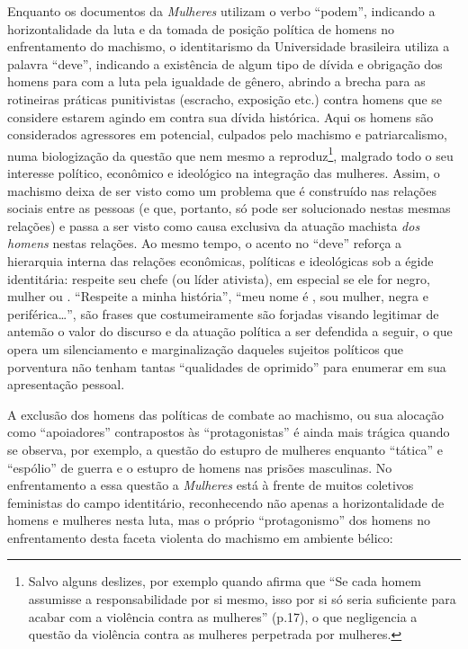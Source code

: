 Enquanto os documentos da \emph{ Mulheres} utilizam o verbo
``podem'', indicando a horizontalidade da luta e da tomada de posição
política de homens no enfrentamento do machismo, o identitarismo da
Universidade brasileira utiliza a palavra ``deve'', indicando a
existência de algum tipo de dívida e obrigação dos homens para com a
luta pela igualdade de gênero, abrindo a brecha para as rotineiras
práticas punitivistas (escracho, exposição etc.) contra homens que se
considere estarem agindo em contra sua dívida histórica. Aqui os homens
são considerados agressores em potencial, culpados pelo machismo e
patriarcalismo, numa biologização da questão que nem mesmo a 
reproduz\footnote{Salvo alguns deslizes, por exemplo quando afirma que
  ``Se cada homem assumisse a responsabilidade por si mesmo, isso por si
  só seria suficiente para acabar com a violência contra as mulheres''
  (p.17), o que negligencia a questão da violência contra as mulheres
  perpetrada por mulheres.}, malgrado todo o seu interesse político,
econômico e ideológico na integração das mulheres. Assim, o machismo
deixa de ser visto como um problema que é construído nas relações
sociais entre as pessoas (e que, portanto, só pode ser solucionado
nestas mesmas relações) e passa a ser visto como causa exclusiva da
atuação machista \emph{dos homens} nestas relações. Ao mesmo tempo, o
acento no ``deve'' reforça a hierarquia interna das relações econômicas,
políticas e ideológicas sob a égide identitária: respeite seu chefe (ou
líder ativista), em especial se ele for negro, mulher ou .
``Respeite a minha história'', ``meu nome é , sou mulher, negra e
periférica\ldots{}'', são frases que costumeiramente são forjadas visando
legitimar de antemão o valor do discurso e da atuação política a ser
defendida a seguir, o que opera um silenciamento e marginalização
daqueles sujeitos políticos que porventura não tenham tantas
``qualidades de oprimido'' para enumerar em sua apresentação pessoal.

A exclusão dos homens das políticas de combate ao machismo, ou sua
alocação como ``apoiadores'' contrapostos às ``protagonistas'' é ainda
mais trágica quando se observa, por exemplo, a questão do estupro de
mulheres enquanto ``tática'' e ``espólio'' de guerra e o estupro de
homens nas prisões masculinas. No enfrentamento a essa questão a
\emph{ Mulheres} está à frente de muitos coletivos feministas do
campo identitário, reconhecendo não apenas a horizontalidade de homens e
mulheres nesta luta, mas o próprio ``protagonismo'' dos homens no
enfrentamento desta faceta violenta do machismo em ambiente bélico:

